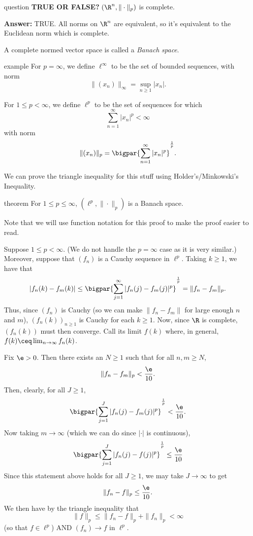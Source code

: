 \documentclass[class=article, crop=false]{standalone}
\begin{document}
\begin{understandingcheck}{question}
  \textbf{TRUE OR FALSE?} $(\R^n, \|\cdot\|_p)$ is complete.

  \textbf{Answer:} TRUE. All norms on $\R^n$ are equivalent, so it's equivalent to the Euclidean norm which is complete.
\end{understandingcheck}

\begin{defn}
  A complete normed vector space is called a \emph{Banach space}.
\end{defn}

\begin{understandingcheck}{example}
  For $p=\infty$, we define $\ell^\infty$ to be the set of bounded sequences, with norm
    \[
      \|(x_n)\|_\infty = \sup_{n \geq 1}|x_n|.
    \]

  For $1 \leq p <\infty$, we define $\ell^p$ to be the set of sequences for which
    \[
      \sum_{n=1}^{\infty} |x_n|^p <\infty
    \]
  with norm
    \[
      \|(x_n)\|_p = \bigpar{\sum_{n=1}^{\infty} |x_n|^p}^{\frac{1}{p}}.
    \]

  We can prove the triangle inequality for this stuff using Holder's/Minkowski's Inequality.
\end{understandingcheck}

\begin{result}{theorem}
  For $1 \leq p \leq \infty$, $(\ell^p, \|\cdot\|_p)$ is a Banach space.
\end{result}
\begin{pf}
  Note that we will use function notation for this proof to make the proof easier to read.

  Suppose $1 \leq p < \infty$. (We do not handle the $p=\infty$ case as it is very similar.) Moreover, suppose that $(f_n)$ is a Cauchy sequence in $\ell^p$. Taking $k \geq 1$, we have that
    \[
      |f_n(k) - f_m(k)| \leq \bigpar{\sum_{j=1}^{\infty} |f_n(j)-f_m(j)|^p}^{\frac{1}{p}} = \|f_n-f_m\|_p.
    \]
  Thus, since $(f_n)$ is Cauchy (so we can make $\|f_n-f_m\|$ for large enough $n$ and $m$), $(f_n(k))_{n \geq 1}$ is Cauchy for each $k \geq 1$. Now, since $\R$ is complete, $(f_n(k))$ must then converge. Call its limit $f(k)$ where, in general, $f(k) \ceq \lim_{n \to \infty} f_n(k)$.

  Fix $\e > 0$. Then there exists an $N \geq 1$ such that for all $n,m \geq N$,
    \[
      \|f_n-f_m\|_p < \frac{\e}{10}.
    \]
  Then, clearly, for all $J \geq 1$,
    \[
      \bigpar{\sum_{j=1}^{J} |f_n(j)-f_m(j)|^p}^{\frac{1}{p}} < \frac{\e}{10}.
    \]
  Now taking $m \to \infty$ (which we can do since $|\cdot|$ is continuous),
    \[
      \bigpar{\sum_{j=1}^{J} |f_n(j)-f(j)|^p}^{\frac{1}{p}} \leq \frac{\e}{10}
    \]
  Since this statement above holds for all $J \geq 1$, we may take $J \to \infty$ to get
    \[
      \|f_n-f\|_p \leq \frac{\e}{10}.
    \]
  We then have by the triangle inequality that
    \[
      \|f\|_p \leq \|f_n-f\|_p + \|f_n\|_p < \infty
    \]
  (so that $f \in \ell^p$) AND $(f_n) \to f$ in $\ell^p$. 
\end{pf}
\end{document}

